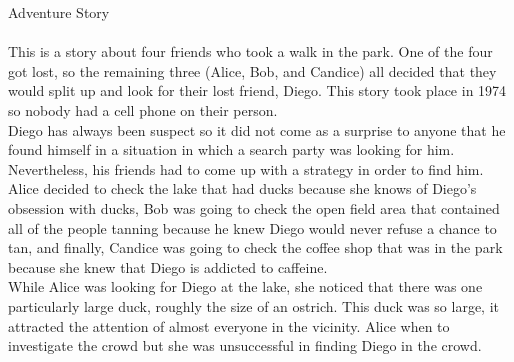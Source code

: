 \documentclass{article}
\begin{document}
\large{Adventure Story} \\ \\
This is a story about four friends who took a walk in the park. One of the four got lost, so the remaining three (Alice, Bob, and Candice) all decided that they would split up and look for their lost friend, Diego. This story took place in 1974 so nobody had a cell phone on their person.\\
Diego has always been suspect so it did not come as a surprise to anyone that he found himself in a situation in which a search party was looking for him. Nevertheless, his friends had to come up with a strategy in order to find him. Alice decided to check the lake that had ducks because she knows of Diego's obsession with ducks, Bob was going to check the open field area that contained all of the people tanning because he knew Diego would never refuse a chance to tan, and finally, Candice was going to check the coffee shop that was in the park because she knew that Diego is addicted to caffeine.\\
While Alice was looking for Diego at the lake, she noticed that there was one particularly large duck, roughly the size of an ostrich. This duck was so large, it attracted the attention of almost everyone in the vicinity. Alice when to investigate the crowd but she was unsuccessful in finding Diego in the crowd.
\end{document}
